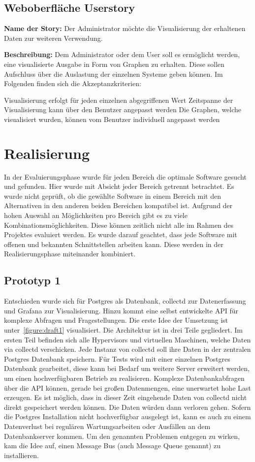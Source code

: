 \section{Weboberfläche Userstory}
\textbf{Name der Story:} Der Administrator möchte die Visualisierung der
erhaltenen Daten zur weiteren Verwendung.

\textbf{Beschreibung:} Dem Administrator oder dem User soll es ermöglicht
werden, eine visualisierte Ausgabe in Form von Graphen zu erhalten. Diese
sollen Aufschluss über die Auslastung der einzelnen Systeme geben können. Im
Folgenden finden sich die Akzeptanzkriterien:

\begin{outline}
  \1 Visualisierung erfolgt für jeden einzelnen abgegriffenen Wert
  \1 Zeitspanne der Visualisierung kann über den Benutzer angepasst werden
  \1 Die Graphen, welche visualisiert wurden, können vom Benutzer individuell
  angepasst werden
\end{outline}
\mr%

\chapter{Realisierung}
In der Evaluierungsphase wurde für jeden Bereich die optimale Software gesucht
und gefunden. Hier wurde mit Absicht jeder Bereich getrennt betrachtet. Es
wurde nicht geprüft, ob die gewählte Software in einem Bereich mit den
Alternativen in den anderen beiden Bereichen kompatibel ist. Aufgrund der hohen
Auswahl an Möglichkeiten pro Bereich gibt es zu viele
Kombinationsmöglichkeiten. Diese können zeitlich nicht alle im Rahmen des
Projektes evaluiert werden. Es wurde darauf geachtet, dass jede Software mit
offenen und bekannten Schnittstellen arbeiten kann. Diese werden in der
Realisierungsphase miteinander kombiniert.

\section{Prototyp 1}
Entschieden wurde sich für Postgres als Datenbank, collectd zur Datenerfassung
und Grafana zur Visualisierung. Hinzu kommt eine selbst entwickelte API für
komplexe Abfragen und Fragestellungen. Die erste Idee der Umsetzung ist
unter~\ref{figure:draft1} visualisiert. Die Architektur ist in drei Teile
gegliedert. Im ersten Teil befinden sich alle Hypervisors und virtuellen
Maschinen, welche Daten via collectd verschicken. Jede Instanz von collectd
soll ihre Daten in der zentralen Postgres Datenbank speichern. Für Tests wird
mit einer einzelnen Postgres Datenbank gearbeitet, diese kann bei Bedarf um
weitere Server erweitert werden, um einen hochverfügbaren Betrieb zu
realisieren. Komplexe Datenbankabfragen über die API können, gerade bei großen
Datenmengen, eine unerwartet hohe Last erzeugen. Es ist möglich, dass in dieser
Zeit eingehende Daten von collectd nicht direkt gespeichert werden können. Die
Daten würden dann verloren gehen. Sofern die Postgres Installation nicht
hochverfügbar ausgelegt ist, kann es auch zu einem Datenverlust bei regulären
Wartungsarbeiten oder Ausfällen an dem Datenbankserver kommen. Um den genannten
Problemen entgegen zu wirken, kam die Idee auf, einen Message Bus (auch Message
Queue genannt) zu installieren.
\tm%

